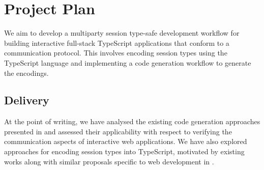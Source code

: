 \documentclass[12pt,twoside]{report}
\begin{document}




%

\chapter{Project Plan}
We aim to develop a multiparty session type-safe development workflow for building interactive full-stack TypeScript applications that conform to a communication protocol. This involves encoding session types using the TypeScript language and implementing a code generation workflow to generate the encodings.

%
%

\section{Delivery}
At the point of writing, we have analysed the existing code generation approaches presented in \cite{Hybrid2016, Scribble, Python2017} and assessed their applicability with respect to verifying the communication aspects of interactive web applications. We have also explored approaches for encoding session types into TypeScript, motivated by existing works along with similar proposals specific to web development in \cite{PureScript2019, MVU2019}.
\end{document}
